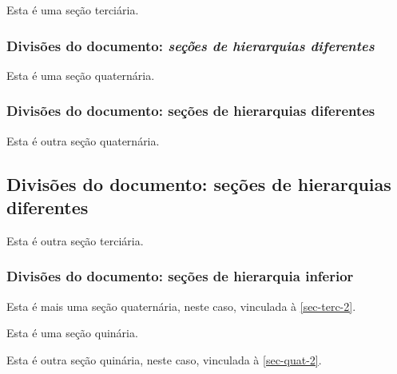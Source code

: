 Esta é uma seção terciária.

\subsubsection{Divisões do documento: \normalfont \itshape seções de hierarquias diferentes}
\label{sec-quat-1}

Esta é uma seção quaternária.

\subsubsection{Divisões do documento: seções de hierarquias diferentes}

Esta é outra seção quaternária.

\subsection{Divisões do documento: seções de hierarquias diferentes}\label{sec-terc-2}

Esta é outra seção terciária.

\subsubsection{Divisões do documento: seções de hierarquia inferior}\label{sec-quat-2}

Esta é mais uma seção quaternária, neste caso, vinculada à \autoref{sec-terc-2}.

\label{sec-quin-1}

\noindent Esta é uma seção quinária.

\label{sec-quin-2}

\noindent Esta é outra seção quinária, neste caso, vinculada à \autoref{sec-quat-2}.

